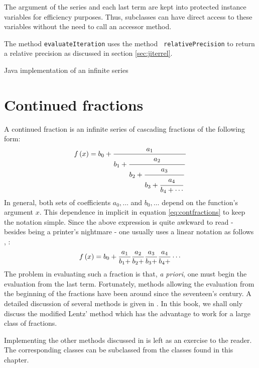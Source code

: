 \documentclass[twoside]{book}
\begin{document}
The argument of the series and each last term are kept into
protected instance variables for efficiency purposes. Thus,
subclasses can have direct access to these variables without the
need to call an accessor method.

The method {\tt evaluateIteration} uses the method {\tt
relativePrecision} to return a relative precision as discussed in
section \ref{sec:jiterrel}.

\begin{listing} Java implementation of an infinite series \label{lj:infseries}

\end{listing}


\section{Continued fractions}
\label{sec:contfractions}
A continued fraction is an infinite
series of cascading fractions of the following form:
\begin{equation}
\label{eq:contfractions}
  f\left( x\right)=b_0+{a_1 \over\displaystyle b_1+
  {\strut a_2 \over\displaystyle b_2+{\strut a_3 \over\displaystyle b_3+
  {\strut a_4 \over\displaystyle b_4+\cdots}}}}
\end{equation}
In general, both sets of coefficients $a_0,\ldots$ and
$b_0,\ldots$ depend on the function's argument $x$. This
dependence in implicit in equation \ref{eq:contfractions} to keep
the notation simple. Since the above expression is quite awkward
to read - besides being a printer's nightmare - one usually uses a
linear notation as follows \cite{AbrSteg}, \cite{Press}:
\begin{equation}
\label{eq:contfractionsline}
  f\left( x\right)=b_0+{a_1 \over b_1+}{a_2 \over b_2+}{a_3 \over b_3+}{a_4 \over
  b_4+}\cdots
\end{equation}
The problem in evaluating such a fraction is that, {\it a priori},
one must begin the evaluation from the last term. Fortunately,
methods allowing the evaluation from the beginning of the
fractions have been around since the seventeen's century. A
detailed discussion of several methods is given in \cite{Press}.
In this book, we shall only discuss the modified Lentz' method
which has the advantage to work for a large class of fractions.

Implementing the other methods discussed in \cite{Press} is left
as an exercise to the reader. The corresponding classes can be
subclassed from the classes found in this chapter.
\end{document}
